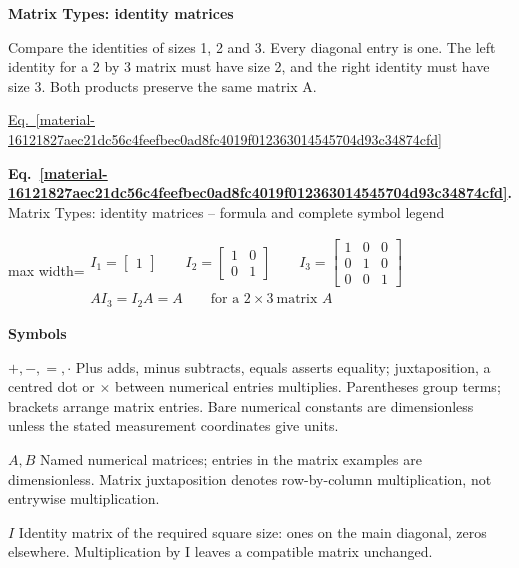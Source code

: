 \documentclass[11pt,a4paper]{article}
\begin{document}
\textbf{Matrix Types: identity matrices}


Compare the identities of sizes 1, 2 and 3. Every diagonal entry is one. The left identity for a 2 by 3 matrix must have size 2, and the right identity must have size 3. Both products preserve the same matrix A.


\hyperref[material-16121827aec21dc56c4feefbec0ad8fc4019f012363014545704d93c34874cfd]{Eq.~\ref*{material-16121827aec21dc56c4feefbec0ad8fc4019f012363014545704d93c34874cfd}}


\par\medskip
\noindent\begin{minipage}{\linewidth}
\label{material-16121827aec21dc56c4feefbec0ad8fc4019f012363014545704d93c34874cfd}
\noindent\textbf{Eq.~\ref*{material-16121827aec21dc56c4feefbec0ad8fc4019f012363014545704d93c34874cfd}.} Matrix Types: identity matrices – formula and complete symbol legend\par\nopagebreak
\begin{center}\begin{adjustbox}{max width=\linewidth}$\displaystyle \begin{gathered}I_1=\begin{bmatrix}\boxed{1}\end{bmatrix}\qquad I_2=\begin{bmatrix}\boxed{1}&0\\0&\boxed{1}\end{bmatrix}\qquad I_3=\begin{bmatrix}\boxed{1}&0&0\\0&\boxed{1}&0\\0&0&\boxed{1}\end{bmatrix}\\[.5em]AI_3=I_2A=A\qquad\text{for a } 2\times3\ \text{matrix } A\end{gathered}$\end{adjustbox}\end{center}

\par\noindent\textbf{Symbols}

\par\noindent\textbf{\(+,-,=,\cdot\)} Plus adds, minus subtracts, equals asserts equality; juxtaposition, a centred dot or \ensuremath{\times} between numerical entries multiplies. Parentheses group terms; brackets arrange matrix entries. Bare numerical constants are dimensionless unless the stated measurement coordinates give units.

\par\noindent\textbf{\(A,B\)} Named numerical matrices; entries in the matrix examples are dimensionless. Matrix juxtaposition denotes row-by-column multiplication, not entrywise multiplication.

\par\noindent\textbf{\(I\)} Identity matrix of the required square size: ones on the main diagonal, zeros elsewhere. Multiplication by I leaves a compatible matrix unchanged.

\end{minipage}\par
\medskip
\end{document}
